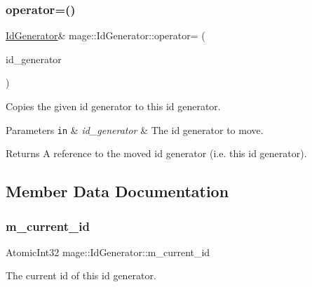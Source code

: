 \subsubsection{\texorpdfstring{operator=()}{operator=()}\hspace{0.1cm}{\footnotesize\ttfamily [2/2]}}
{\footnotesize\ttfamily \hyperlink{structmage_1_1_id_generator}{Id\+Generator}\& mage\+::\+Id\+Generator\+::operator= (\begin{DoxyParamCaption}\item[{\hyperlink{structmage_1_1_id_generator}{Id\+Generator} \&\&}]{id\+\_\+generator }\end{DoxyParamCaption})\hspace{0.3cm}{\ttfamily [delete]}}

Copies the given id generator to this id generator.


\begin{DoxyParams}[1]{Parameters}
\mbox{\tt in}  & {\em id\+\_\+generator} & The id generator to move. \\
\hline
\end{DoxyParams}
\begin{DoxyReturn}{Returns}
A reference to the moved id generator (i.\+e. this id generator). 
\end{DoxyReturn}


\subsection{Member Data Documentation}
\hypertarget{structmage_1_1_id_generator_ab094c8e57444d4fa02d5f3c2a5ea25f3}{}\label{structmage_1_1_id_generator_ab094c8e57444d4fa02d5f3c2a5ea25f3} 
\subsubsection{\texorpdfstring{m\+\_\+current\+\_\+id}{m\_current\_id}}
{\footnotesize\ttfamily Atomic\+Int32 mage\+::\+Id\+Generator\+::m\+\_\+current\+\_\+id\hspace{0.3cm}{\ttfamily [private]}}

The current id of this id generator. 